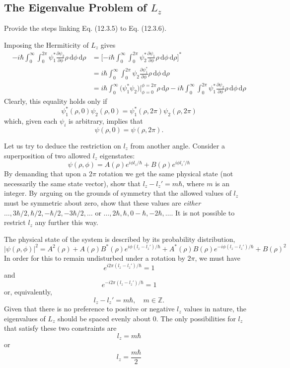 \documentclass[../principles-of-quantum-mechanics.tex]{subfiles}
\begin{document}
\begin{questions}
	\setcounter{subsection}{2}
	\setcounter{question}{0}
	\subsection{The Eigenvalue Problem of $L_z$}
	\question Provide the steps linking Eq. (12.3.5) to Eq. (12.3.6).
	\begin{solution}
		Imposing the Hermiticity of $L_z$ gives
		\begin{align*}
			-i\hbar\int_0^\infty\!\!\!\int_0^{2\pi}\psi_1^*\frac{\partial\psi_2}{\partial\phi}\rho\,\mathrm{d}\phi\,\mathrm{d}\rho &= \Big[{-i\hbar}\int_0^\infty\!\!\!\int_0^{2\pi}\psi_2^*\frac{\partial\psi_1}{\partial\phi}\rho\,\mathrm{d}\phi\,\mathrm{d}\rho\Big]^* \\
			&= i\hbar\int_0^{\infty}\!\!\!\int_0^{2\pi}\psi_2\frac{\partial\psi_1^*}{\partial\phi}\rho\,\mathrm{d}\phi\,\mathrm{d}\rho \\
			&= i\hbar\int_0^\infty\big(\psi_1^*\psi_2\big)\Big|_{\phi=0}^{\phi=2\pi}\rho\,\mathrm{d}\rho - i\hbar\int_0^{\infty}\!\!\!\int_0^{2\pi}\psi_1^*\frac{\partial\psi_2}{\partial\phi}\rho\,\mathrm{d}\phi\,\mathrm{d}\rho
		\end{align*}
		Clearly, this equality holds only if
		$$\psi_1^*(\rho, 0)\psi_2(\rho, 0) = \psi_1^*(\rho, 2\pi)\psi_2(\rho, 2\pi)$$
		which, given each $\psi_i$ is arbitrary, implies that
		$$\psi(\rho, 0) = \psi(\rho, 2\pi).$$
	\end{solution}
	
	\question Let us try to deduce the restriction on $l_z$ from another angle. Consider a superposition of two allowed $l_z$ eigenstates:
	$$\psi(\rho, \phi) = A(\rho)e^{i\phi l_z/\hbar} + B(\rho)e^{i\phi l_z'/\hbar}$$
	By demanding that upon a $2\pi$ rotation we get the same physical state (not necessarily the same state vector), show that $l_z - l_z' = m\hbar$, where $m$ is an integer. By arguing on the grounds of symmetry that the allowed values of $l_z$ must be symmetric about zero, show that these values are \textit{either} $\dots, 3\hbar/2, \hbar/2, -\hbar/2, -3\hbar/2, \dots$ or $\dots, 2\hbar, \hbar, 0 -\hbar, -2\hbar, \dots$. It is not possible to restrict $l_z$ any further this way.
	\begin{solution}
		The physical state of the system is described by its probability distribution, 
		$$|\psi(\rho, \phi)|^2 = A^2(\rho) + A(\rho)B^*(\rho)e^{i\phi(l_z - l_z')/\hbar} + A^*(\rho)B(\rho)e^{-i\phi(l_z - l_z')/\hbar} + B(\rho)^2$$
		In order for this to remain undisturbed under a rotation by $2\pi$, we must have
		$$e^{i2\pi(l_z - l_z')/\hbar} = 1$$
		and
		$$e^{-i2\pi(l_z - l_z')/\hbar}=1$$
		or, equivalently,
		$$l_z - l_z' = m\hbar, \quad m\in\mathbb{Z}.$$
		Given that there is no preference to positive or negative $l_z$ values in nature, the eigenvalues of $L_z$ should be spaced evenly about $0$. The only possibilities for $l_z$ that satisfy these two constraints are
		$$l_z = m\hbar$$
		or
		$$l_z = \frac{m\hbar}{2}$$
	\end{solution}
	

\end{questions}
\end{document}
